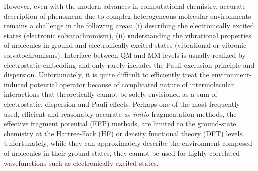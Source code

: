 \documentclass[aip,amsmath,amssymb,reprint,floatfix]{revtex4-1}
\begin{document}
However, even with the modern advances in computational chemistry, 
accurate description of phenomena due to complex heterogeneous molecular environments 
remains a challenge in the following areas: (i) describing the electronically excited states 
(electronic solvatochromism),\cite{Barbati.JACS.2014,
Szabla.Sponer.Jiri.Gora.JPCL.2015,
Bednarska.Zalesny.Tian.Murugan.Agren.Bartkowiak.Molecules.2017,
Jedrzejewska.Grabarz.Bartkowiak.Osmialowski.SpectChimActA.2018} 
(ii) understanding the vibrational properties of molecules in ground and electronically excited states
(vibrational or vibronic solvatochromisms).\cite{Blasiak.Londergan.Webb.Cho.ACR.2017} 
Interface between QM and MM levels is usually realized by electrostatic embedding
and only rarely includes the Pauli exclusion principle and dispersion.\cite{List.Olsen.Kongsted.PCCP.2016}
Unfortunately, it is quite difficult to efficiently treat the environment\hyp{}induced potential operator
because of complicated nature of intermolecular interactions that theoretically
cannot be solely envisioned as a sum of electrostatic, dispersion and Pauli effects.
Perhaps one of the most frequently used, efficient and reasonably accurate \emph{ab initio} fragmentation methods,
the effective fragment potential (EFP) methods, are limited to the ground\hyp{}state
chemistry at the Hartree\hyp{}Fock (HF)\cite{Roothaan.RevModPhys.1951,Gordon.Smith.Xu.Slipchenko.AnnuRevPhysChem.2013} 
or density functional theory (DFT) levels\cite{Nguyen.Pachter.Day.JCP.2014}.
Unfortunately, while they can approximately describe the environment composed of molecules in their ground states,
they cannot be used for highly correlated wavefunctions such as electronically excited states.
\end{document}
